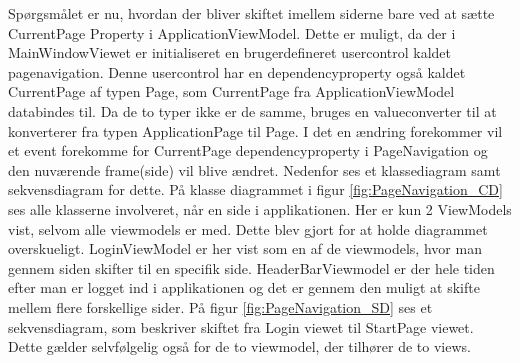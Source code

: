 \documentclass[SoftwareDesign/SoftwareDesign_main.tex]{subfiles}
\begin{document}
Spørgsmålet er nu, hvordan der bliver skiftet imellem siderne bare ved at sætte CurrentPage Property i ApplicationViewModel. Dette er muligt, da der i MainWindowViewet er initialiseret en brugerdefineret usercontrol kaldet pagenavigation. Denne usercontrol har en dependencyproperty også kaldet CurrentPage af typen Page, som CurrentPage fra ApplicationViewModel databindes til. Da de to typer ikke er de samme, bruges en valueconverter til at konverterer fra typen ApplicationPage til Page. I det en ændring forekommer vil et event forekomme for CurrentPage dependencyproperty i PageNavigation og den nuværende frame(side) vil blive ændret. Nedenfor ses et klassediagram samt sekvensdiagram for dette. På klasse diagrammet i figur \ref{fig:PageNavigation_CD} ses alle klasserne involveret, når en side i applikationen. Her er kun 2 ViewModels vist, selvom alle viewmodels er med. Dette blev gjort for at holde diagrammet overskueligt. LoginViewModel er her vist som en af de viewmodels, hvor man gennem siden skifter til en specifik side. HeaderBarViewmodel er der hele tiden efter man er logget ind i applikationen og det er gennem den muligt at skifte mellem flere forskellige sider. På figur \ref{fig:PageNavigation_SD} ses et sekvensdiagram, som beskriver skiftet fra Login viewet til StartPage viewet. Dette gælder selvfølgelig også for de to viewmodel, der tilhører de to views.
 
\end{document}
